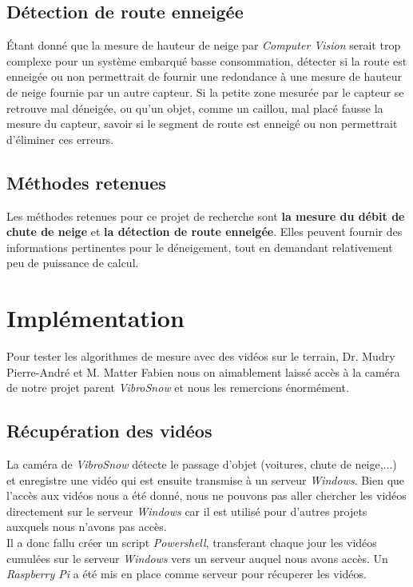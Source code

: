 \subsection{Détection de route enneigée}
Étant donné que la mesure de hauteur de neige par \emph{Computer Vision} serait trop complexe
pour un système embarqué basse consommation, détecter si la route est enneigée ou non
permettrait de fournir une redondance à une mesure de hauteur de neige fournie par un autre capteur.
Si la petite zone mesurée par le capteur se retrouve mal déneigée, ou qu'un objet, comme un caillou, mal placé
fausse la mesure du capteur, savoir si le segment de route est enneigé ou non permettrait d'éliminer ces erreurs.

\subsection{Méthodes retenues}
Les méthodes retenues pour ce projet de recherche sont \textbf{la mesure du débit de chute de neige}
et \textbf{la détection de route enneigée}. Elles peuvent fournir des informations pertinentes
pour le déneigement, tout en demandant relativement peu de puissance de calcul.
\newpage

\section{Implémentation}
Pour tester les algorithmes de mesure avec des vidéos sur le terrain,
Dr. Mudry Pierre-André et M. Matter Fabien nous on aimablement laissé accès à
la caméra de notre projet parent \emph{VibroSnow\cite{VibroSnow}} et nous
les remercions énormément.

\subsection{Récupération des vidéos}
La caméra de \emph{VibroSnow} détecte le passage d'objet (voitures, chute de neige,...) et
enregistre une vidéo qui est ensuite transmise à un serveur \emph{Windows}.
Bien que l'accès aux vidéos nous a été donné, nous ne pouvons pas aller chercher les vidéos
directement sur le serveur \emph{Windows} car il est utilisé pour d'autres projets auxquels nous
n'avons pas accès.\\
Il a donc fallu créer un script \emph{Powershell}, transferant chaque jour les vidéos
cumulées sur le serveur \emph{Windows} vers un serveur auquel nous avons accès.
Un \emph{Raspberry Pi} a été mis en place comme serveur pour récuperer les vidéos.

